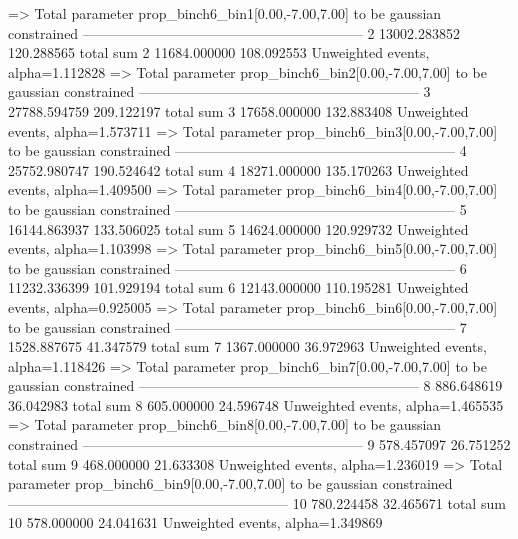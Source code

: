   => Total parameter prop_binch6_bin1[0.00,-7.00,7.00] to be gaussian constrained
------------------------------------------------------------
2          13002.283852    120.288565      total sum                     
2          11684.000000    108.092553      Unweighted events, alpha=1.112828
  => Total parameter prop_binch6_bin2[0.00,-7.00,7.00] to be gaussian constrained
------------------------------------------------------------
3          27788.594759    209.122197      total sum                     
3          17658.000000    132.883408      Unweighted events, alpha=1.573711
  => Total parameter prop_binch6_bin3[0.00,-7.00,7.00] to be gaussian constrained
------------------------------------------------------------
4          25752.980747    190.524642      total sum                     
4          18271.000000    135.170263      Unweighted events, alpha=1.409500
  => Total parameter prop_binch6_bin4[0.00,-7.00,7.00] to be gaussian constrained
------------------------------------------------------------
5          16144.863937    133.506025      total sum                     
5          14624.000000    120.929732      Unweighted events, alpha=1.103998
  => Total parameter prop_binch6_bin5[0.00,-7.00,7.00] to be gaussian constrained
------------------------------------------------------------
6          11232.336399    101.929194      total sum                     
6          12143.000000    110.195281      Unweighted events, alpha=0.925005
  => Total parameter prop_binch6_bin6[0.00,-7.00,7.00] to be gaussian constrained
------------------------------------------------------------
7          1528.887675     41.347579       total sum                     
7          1367.000000     36.972963       Unweighted events, alpha=1.118426
  => Total parameter prop_binch6_bin7[0.00,-7.00,7.00] to be gaussian constrained
------------------------------------------------------------
8          886.648619      36.042983       total sum                     
8          605.000000      24.596748       Unweighted events, alpha=1.465535
  => Total parameter prop_binch6_bin8[0.00,-7.00,7.00] to be gaussian constrained
------------------------------------------------------------
9          578.457097      26.751252       total sum                     
9          468.000000      21.633308       Unweighted events, alpha=1.236019
  => Total parameter prop_binch6_bin9[0.00,-7.00,7.00] to be gaussian constrained
------------------------------------------------------------
10         780.224458      32.465671       total sum                     
10         578.000000      24.041631       Unweighted events, alpha=1.349869
